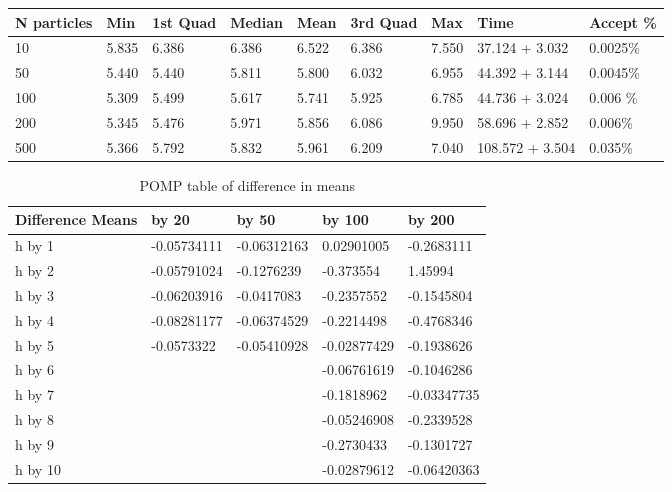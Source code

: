 \documentclass[a4paper,11pt]{article}
\begin{document}
\begin{table}[h]
\centering
\begin{tabular}{lllllllll}
N particles & Min   & 1st Quad & Median & Mean  & 3rd Quad & Max   & Time            & Accept \% \\ \hline
10          & 5.835 & 6.386    & 6.386  & 6.522 & 6.386    & 7.550 & 37.124 + 3.032  & 0.0025\% \\
50          & 5.440 & 5.440    & 5.811  & 5.800 & 6.032    & 6.955 & 44.392 + 3.144  & 0.0045\% \\
100         & 5.309 & 5.499    & 5.617  & 5.741 & 5.925    & 6.785 & 44.736 + 3.024  & 0.006 \% \\
200         & 5.345 & 5.476    & 5.971  & 5.856 & 6.086    & 9.950 & 58.696 + 2.852  & 0.006\% \\
500         & 5.366 & 5.792    & 5.832  & 5.961 & 6.209    & 7.040 & 108.572 + 3.504 & 0.035\%            
\end{tabular}
\end{table}

\begin{table}[h]
\centering
\caption{POMP table of difference in means}
\begin{tabular}{|l|l|l|l|l|}
\hline
Difference Means & by 20       & by 50       & by 100      & by 200      \\ \hline
h by 1           & -0.05734111 & -0.06312163 & 0.02901005  & -0.2683111  \\ \hline
h by 2           & -0.05791024 & -0.1276239  & -0.373554   & 1.45994     \\ \hline
h by 3           & -0.06203916 & -0.0417083  & -0.2357552  & -0.1545804  \\ \hline
h by 4           & -0.08281177 & -0.06374529 & -0.2214498  & -0.4768346  \\ \hline
h by 5           & -0.0573322  & -0.05410928 & -0.02877429 & -0.1938626  \\ \hline
h by 6           &             &             & -0.06761619 & -0.1046286  \\ \hline
h by 7           &             &             & -0.1818962  & -0.03347735 \\ \hline
h by 8           &             &             & -0.05246908 & -0.2339528  \\ \hline
h by 9           &             &             & -0.2730433  & -0.1301727  \\ \hline
h by 10          &             &             & -0.02879612 & -0.06420363 \\ \hline
\end{tabular}
\end{table}
\end{document}
